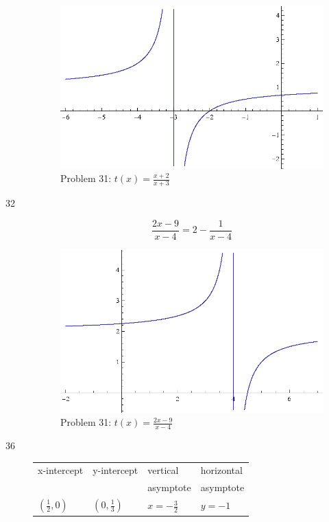 \documentclass{exam}
\begin{document}
\begin{description}
      \begin{figure}[H]
        \centering
        \includegraphics[scale = 0.9]{problem31.eps}
        \caption*{Problem 31: $t(x) = \frac{x + 2}{x + 3}$}
      \end{figure}

    \item[32] 
      \[ \frac{2x - 9}{x - 4} = 2 - \frac{1}{x - 4} \]

      \begin{figure}[H]
        \centering
        \includegraphics[scale = 0.9]{problem32.eps}
        \caption*{Problem 31: $t(x) = \frac{2x - 9}{x - 4}$}
      \end{figure}

    \item[36]
      \begin{tabular}{llll}
        \toprule
        x-intercept                     & y-intercept                     & vertical            & horizontal \\
                                        &                                 & asymptote           & asymptote \\
        \midrule
        $\left( \frac{1}{2}, 0 \right)$ & $\left( 0, \frac{1}{3} \right)$ & $x = - \frac{3}{2}$ & $y = -1$ \\
        \bottomrule
      \end{tabular}


\end{description}
\end{document}
